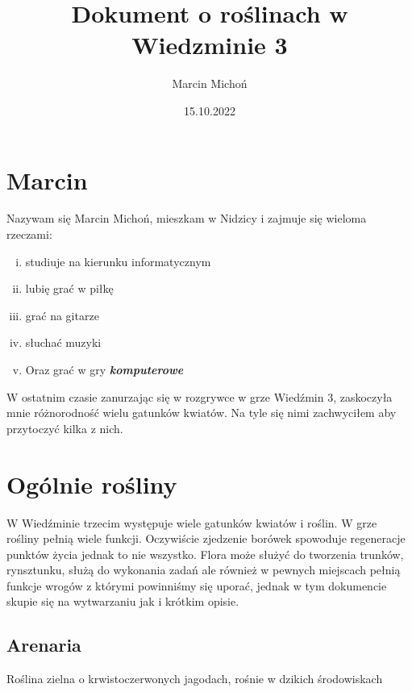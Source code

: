 \documentclass[12pt, letterpaper, titlepage]{article}
\title{Dokument o roślinach w Wiedzminie 3}
\author{Marcin Michoń}
\date{15.10.2022}
\begin{document}
\maketitle
\section{Marcin} %
Nazywam się Marcin Michoń, mieszkam w Nidzicy i zajmuje się wieloma rzeczami:
\begin{enumerate}[i)]
\item studiuje na kierunku informatycznym
\item lubię grać w piłkę
\item grać na gitarze
\item słuchać muzyki
\item Oraz grać w gry \textbf {\textit {komputerowe}}
\end{enumerate}
\newpage
W ostatnim czasie zanurzając się w rozgrywce w grze Wiedźmin 3, zaskoczyła mnie różnorodność wielu gatunków kwiatów. Na tyle się nimi zachwyciłem aby przytoczyć kilka z nich.

\section{Ogólnie rośliny} %
W Wiedźminie trzecim występuje wiele gatunków kwiatów i roślin.
W grze rośliny pełnią wiele funkcji.  Oczywiście zjedzenie borówek spowoduje regeneracje punktów życia jednak to nie wszystko. Flora może służyć do tworzenia trunków, rynsztunku, służą do wykonania zadań ale również w pewnych miejscach pełnią funkcje wrogów z  którymi powinniśmy się uporać, jednak w tym dokumencie skupie się na wytwarzaniu jak i krótkim opisie.
\newline 


\subsection{Arenaria}
Roślina zielna o krwistoczerwonych jagodach, rośnie w dzikich środowiskach\\
\end{document}
